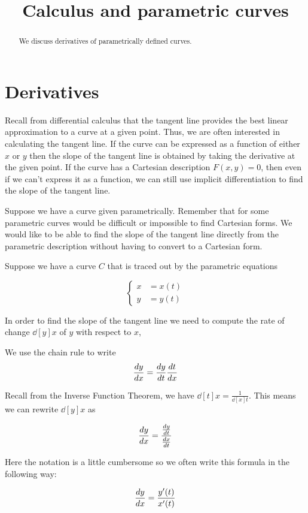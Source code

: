 \documentclass{ximera}
\title[Dig-In:]{Calculus and parametric curves}
\begin{document}
\begin{abstract}
  We discuss derivatives of parametrically defined curves.  
\end{abstract}
\maketitle

\section{Derivatives}

Recall from differential calculus that the tangent line provides the best linear approximation to a curve at a given point. Thus, we are often interested in calculating the tangent line.   If the curve can be expressed as a function of either $x$ or $y$ then the slope of the tangent line is obtained by taking the derivative at the given point. If the curve has a Cartesian description $F(x,y)=0$, then even if we can't express it as a function, we can still use implicit differentiation to find the slope of the tangent line. 

Suppose we have a curve given parametrically. Remember that for some parametric curves would be difficult or impossible to find Cartesian forms. We would like to be able to find the slope of the tangent line directly from the parametric description without having to convert to a Cartesian form.


Suppose we have a curve $C$ that is traced out by the parametric equations 

\[ 
\begin{cases}
x&=x(t) \\
y&=y(t)
\end{cases}
\]

In order to find the slope of the tangent line we need to compute the rate of change  $\dd[y]{x}$ of $y$ with respect to $x$,

We use the chain rule to write 
\[
\frac{\d y}{\d x} = \dd[y]{t} \dd[t]{x}
\]

Recall from the Inverse Function Theorem, we have $\dd[t]{x}=\frac{1}{\dd[x]{t}}$. This means we can rewrite $\dd[y]{x}$ as 

\[
\frac{\d y}{\d x} = \frac{\dd[y]{t}}{ \dd[x]{t}}
\]

Here the notation is a little cumbersome so we often write this formula in the following way:

\[
\frac{\d y}{\d x} = \frac{ y'(t)}{x'(t)}
\]
\end{document}
